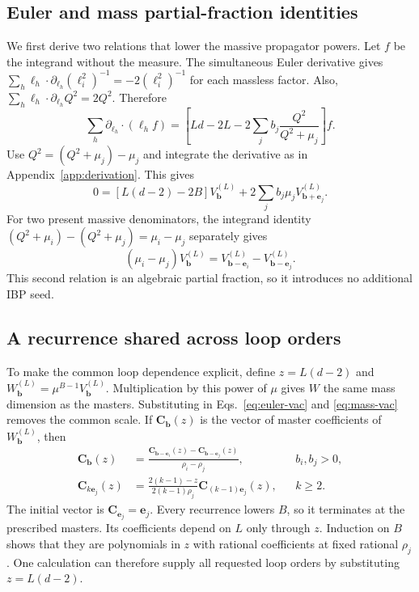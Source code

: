 \subsection{Euler and mass partial-fraction identities}
We first derive two relations that lower the massive propagator powers. Let $f$ be the integrand without the measure. The simultaneous Euler derivative gives $\sum_h\ell_h\cdot\partial_{\ell_h}(\ell_i^2)^{-1}=-2(\ell_i^2)^{-1}$ for each massless factor. Also, $\sum_h\ell_h\cdot\partial_{\ell_h}Q^2=2Q^2$. Therefore
\begin{equation}
 \sum_h\partial_{\ell_h}\cdot(\ell_h f)
 =\left[Ld-2L-2\sum_jb_j\frac{Q^2}{Q^2+\mu_j}\right]f.
\end{equation}
Use $Q^2=(Q^2+\mu_j)-\mu_j$ and integrate the derivative as in Appendix~\ref{app:derivation}. This gives
\begin{equation}
 0=[L(d-2)-2B]V^{(L)}_{\boldsymbol b}
       +2\sum_j b_j\mu_jV^{(L)}_{\boldsymbol b+\boldsymbol e_j}.
 \label{eq:euler-vac}
\end{equation}
For two present massive denominators, the integrand identity
$(Q^2+\mu_i)-(Q^2+\mu_j)=\mu_i-\mu_j$ separately gives
\begin{equation}
 (\mu_i-\mu_j)V_{\boldsymbol b}^{(L)}
   =V_{\boldsymbol b-\boldsymbol e_i}^{(L)}
    -V_{\boldsymbol b-\boldsymbol e_j}^{(L)}.
 \label{eq:mass-vac}
\end{equation}
This second relation is an algebraic partial fraction, so it introduces no additional IBP seed.

\subsection{A recurrence shared across loop orders}
To make the common loop dependence explicit, define $z=L(d-2)$ and $W_{\boldsymbol b}^{(L)}=\mu^{B-1}V_{\boldsymbol b}^{(L)}$. Multiplication by this power of $\mu$ gives $W$ the same mass dimension as the masters. Substituting in Eqs.~\eqref{eq:euler-vac} and \eqref{eq:mass-vac} removes the common scale. If $\boldsymbol C_{\boldsymbol b}(z)$ is the vector of master coefficients of $W_{\boldsymbol b}^{(L)}$, then
\begin{align}
 \boldsymbol C_{\boldsymbol b}(z)
 &=\frac{\boldsymbol C_{\boldsymbol b-\boldsymbol e_i}(z)
          -\boldsymbol C_{\boldsymbol b-\boldsymbol e_j}(z)}{\rho_i-\rho_j},
       &&b_i,b_j>0,\label{eq:mass-rec}\\
 \boldsymbol C_{k\boldsymbol e_j}(z)
 &=\frac{2(k-1)-z}{2(k-1)\rho_j}
         \boldsymbol C_{(k-1)\boldsymbol e_j}(z),
       &&k\geq2.\label{eq:euler-rec}
\end{align}
The initial vector is $\boldsymbol C_{\boldsymbol e_j}=\boldsymbol e_j$. Every recurrence lowers $B$, so it terminates at the prescribed masters. Its coefficients depend on $L$ only through $z$. Induction on $B$ shows that they are polynomials in $z$ with rational coefficients at fixed rational $\rho_j$. One calculation can therefore supply all requested loop orders by substituting $z=L(d-2)$.

